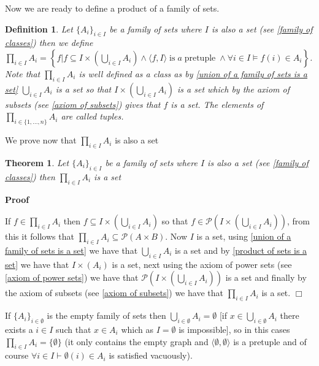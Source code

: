 \documentclass{book}
\newcommand{\tmop}[1]{\ensuremath{\operatorname{#1}}}
\newenvironment{proof}{\noindent\textbf{Proof\ }}{\hspace*{\fill}$\Box$\medskip}
\newtheorem{definition}{Definition}
{\theorembodyfont{\rmfamily}\newtheorem{example}{Example}}
\newtheorem{theorem}{Theorem}
\begin{document}
{{Now we are ready to define a product of a family of sets.

\begin{definition}
  \label{generalized product of sets}Let $\{ A_i \}_{i \in I}$ be a family of
  sets where $I$ is also a set (see \ref{family of classes}) then we define
  $\prod_{i \in I} A_i = \left\{ f|f \subseteq I \times \left( \bigcup_{i \in
  I} A_i \right) \wedge \langle f, I \rangle \tmop{is} a \tmop{pretuple}
  \wedge \forall i \in I \vDash f (i) \in A_i \right\}$. Note that $\prod_{i
  \in I} A_i$ is well defined as a class as by \ref{union of a family of sets
  is a set} $\bigcup_{i \in I} A_i$ is a set so that $I \times \left(
  \bigcup_{i \in I} A_i \right)$ is a set which by the axiom of subsets (see
  \ref{axiom of subsets}) gives that $f$ is a set. The elements of $\prod_{i
  \in \{ 1, \ldots, n \}} A_i$ are called tuples.
\end{definition}

We prove now that $\prod_{i \in I} A_i$ is also a set

\begin{theorem}
  \label{general product of sets is a set}Let $\{ A_i \}_{i \in I}$ be a
  family of sets where $I$ is also a set (see \ref{family of classes}) then
  $\prod_{i \in I} A_i$ is a set
\end{theorem}

\begin{proof}
  \
  
  If $f \in \prod_{i \in I} A_i$ then $f \subseteq I \times \left( \bigcup_{i
  \in I} A_i \right)$ so that $f \in \mathcal{P} \left( I \times \left(
  \bigcup_{i \in I} A_i \right) \right)$, from this it follows that $\prod_{i
  \in I} A_i \subseteq \mathcal{P} (A \times B)$. Now $I$ is a set, using
  \ref{union of a family of sets is a set} we have that $\bigcup_{i \in I}
  A_i$ is a set and by \ref{product of sets is a set} we have that $I \times
  (A_i)$ is a set, next using the axiom of power sets (see \ref{axiom of power
  sets}) we have that $\mathcal{P} \left( I \times \left( \bigcup_{i \in I}
  A_i \right) \right)$ is a set and finally by the axiom of subsets (see
  \ref{axiom of subsets}) we have that $\prod_{i \in I} A_i$ is a set. 
\end{proof}

\begin{example}
  \label{product of a empty family}If $\{ A_i \}_{i \in \emptyset}$ is the
  empty family of sets then $\bigcup_{i \in \emptyset} A_i = \emptyset$ [if $x
  \in \bigcup_{i \in \emptyset} A_i$ there exists a $i \in I$ such that $x \in
  A_i$ which as $I = \emptyset$ is impossible], so in this cases $\prod_{i \in
  I} A_i = \{ \emptyset \}$ (it only contains the empty graph and $\langle
  \emptyset, \emptyset \rangle$ is a pretuple and of course $\forall i \in I
  \vdash \emptyset (i) \in A_i$ is satisfied vacuously).
\end{example}

}}
\end{document}
